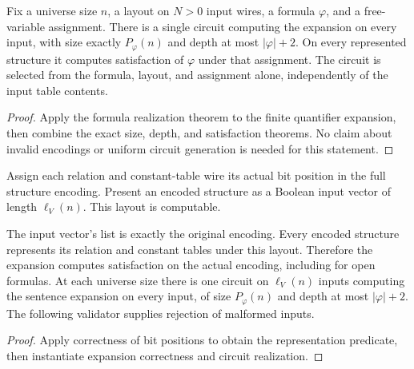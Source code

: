 \begin{theorem}
  \label{thm:desc-table-circuit}
  \leanok
  Fix a universe size $n$, a layout on $N>0$ input wires, a formula $\varphi$,
  and a free-variable assignment. There is a single circuit computing the
  expansion on every input, with size exactly $P_\varphi(n)$ and depth at most
  $|\varphi|+2$. On every represented structure it computes satisfaction of
  $\varphi$ under that assignment. The circuit is selected from the formula,
  layout, and assignment alone, independently of the input table contents.
\end{theorem}
\begin{proof}
  \leanok
  Apply the formula realization theorem to the finite quantifier expansion,
  then combine the exact size, depth, and satisfaction theorems. No claim about
  invalid encodings or uniform circuit generation is needed for this statement.
\end{proof}

\begin{definition}
  \label{def:desc-encoding-layout}
  \leanok
  Assign each relation and constant-table wire its actual bit position in the
  full structure encoding. Present an encoded structure as a Boolean input
  vector of length $\ell_V(n)$. This layout is computable.
\end{definition}

\begin{theorem}
  \label{thm:desc-encoded-expansion}
  \leanok
  The input vector's list is exactly the original encoding. Every encoded
  structure represents its relation and constant tables under
  this layout. Therefore the expansion computes satisfaction on the actual
  encoding, including for open formulas. At each universe size there is one
  circuit on $\ell_V(n)$ inputs computing the sentence expansion on every input,
  of size $P_\varphi(n)$ and depth at most $|\varphi|+2$.
  The following validator supplies rejection of malformed inputs.
\end{theorem}
\begin{proof}
  \leanok
  Apply correctness of bit positions to obtain the representation predicate,
  then instantiate expansion correctness and circuit realization.
\end{proof}

